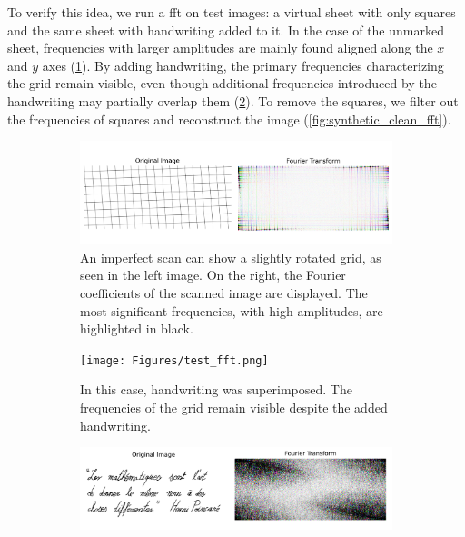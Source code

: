\begin{modified}
    \noindent To verify this idea, we run a \gls{fft} on test images: a virtual sheet with only squares and the same sheet with handwriting added to it. In the case of the unmarked sheet, frequencies with larger amplitudes are mainly found aligned along the $x$ and $y$ axes (\cref{fig:synthetic_grid_fft}). By adding handwriting, the primary frequencies characterizing the grid remain visible, even though additional frequencies introduced by the handwriting may partially overlap them (\cref{fig:synthetic_sign_fft}). To remove the squares, we filter out the frequencies of squares and reconstruct the image (\cref{fig:synthetic_clean_fft}).
\end{modified}

\begin{figure}
	\centering
	\begin{subfigure}[t]{\linewidth}
		\includegraphics[width=\linewidth]{Figures/grid_fft.png}
		\caption{An imperfect scan can show a slightly rotated grid, as seen in the left image. On the right, the Fourier coefficients of the scanned image are displayed. The most significant frequencies, with high amplitudes, are highlighted in black.}
		\label{fig:synthetic_grid_fft}
	\end{subfigure}
	\begin{subfigure}[t]{\linewidth}
		\texttt{[image: Figures/test\_fft.png]}
		\caption{In this case, handwriting was superimposed. The frequencies of the grid remain visible despite the added handwriting.}
		\label{fig:synthetic_sign_fft}
	\end{subfigure}
	\begin{subfigure}[t]{\linewidth}
		\includegraphics[width=\linewidth]{Figures/clean_fft.png}

\end{subfigure}
\end{figure}
